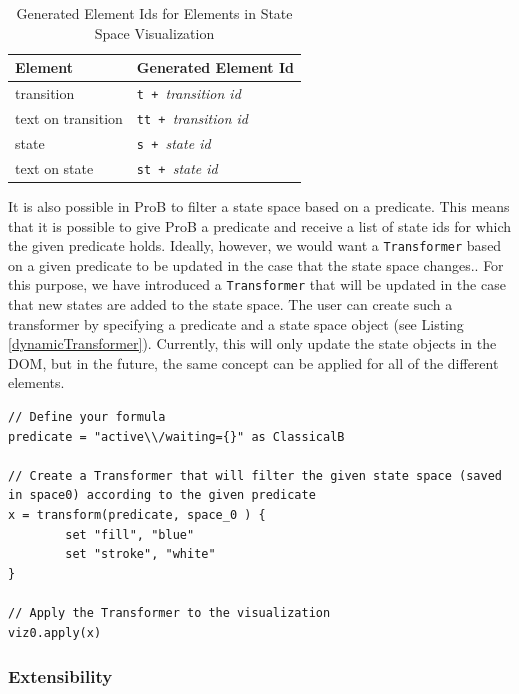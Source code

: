 \begin{table}[h!]
\caption{Generated Element Ids for Elements in State Space Visualization}
\label{tab:elements}
\begin{center}
\begin{tabular}{ | l | l | }
\hline
\textbf{Element} & \textbf{Generated Element Id} \\ \hline \hline
transition & \texttt{t + }\emph{transition id} \\ \hline
text on transition & \texttt{tt + }\emph{transition id} \\ \hline
state & \texttt{s + }\emph{state id} \\ \hline
text on state & \texttt{st + }\emph{state id} \\ \hline
\end{tabular}
\end{center}
\end{table}

It is also possible in ProB to filter a state space based on a predicate. This means that it is possible to give ProB a predicate and receive a list of state ids for which the given predicate holds. Ideally, however, we would want a \texttt{Transformer} based on a given predicate to be updated in the case that the state space changes.. For this purpose, we have introduced a \texttt{Transformer} that will be updated in the case that new states are added to the state space. The user can create such a transformer by specifying a predicate and a state space object (see Listing \ref{dynamicTransformer}). Currently, this will only update the state objects in the DOM, but in the future, the same concept can be applied for all of the different elements. 

\begin{lstlisting}[caption=Create a \texttt{Transformer} based on the states that match a given predicate,label=dynamicTransformer]
// Define your formula
predicate = "active\\/waiting={}" as ClassicalB

// Create a Transformer that will filter the given state space (saved in space0) according to the given predicate
x = transform(predicate, space_0 ) {
		set "fill", "blue"
		set "stroke", "white"
}

// Apply the Transformer to the visualization
viz0.apply(x)
\end{lstlisting}





\subsubsection{Extensibility}

